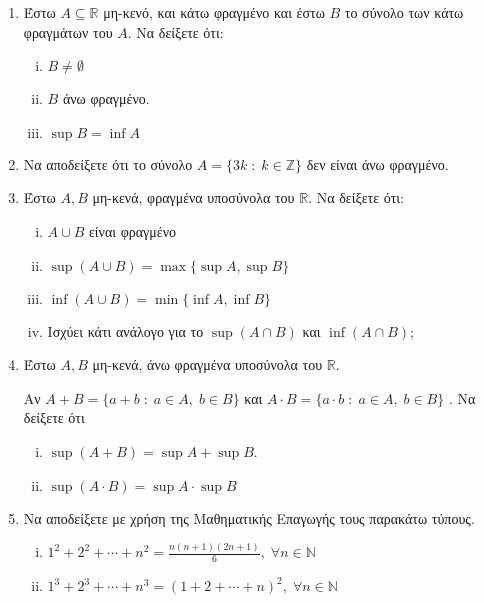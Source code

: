 \begin{enumerate}
    \item Έστω $ A \subseteq \mathbb{R} $ μη-κενό, και κάτω φραγμένο και έστω 
        $ B $ το σύνολο των κάτω φραγμάτων του $A$. Να δείξετε ότι:
        \begin{enumerate}[i)]
            \item $ B \neq \emptyset $
            \item $B$ άνω φραγμένο.
            \item $ \sup B = \inf A $
        \end{enumerate}

    \item \label{ask:3z} Να αποδείξετε ότι το σύνολο $ A = \{ 3k \; : \; k \in \mathbb{Z} \} $ 
        δεν είναι άνω φραγμένο.

    \item Έστω $ A,B $ μη-κενά, φραγμένα υποσύνολα του $ \mathbb{R} $. Να 
        δείξετε ότι:
        \begin{enumerate}[i)]
            \item $ A \cup B  $ είναι φραγμένο
            \item $ \sup {(A\cup B)} = \max \{ \sup A, \sup B \} $
            \item $ \inf {(A\cup B)} = \min \{ \inf A, \inf B \} $
            \item Ισχύει κάτι ανάλογο για το $ \sup {(A\cap B)} $ και 
                $ \inf {(A\cap B)} $;
        \end{enumerate}

    \item Έστω $ A, B $ μη-κενά, άνω φραγμένα υποσύνολα του $ \mathbb{R} $.
        
        Αν $ A+B = \{ a+b \; : \; a \in A, \; b\in B \} $ και $A \cdot B = 
        \{ a\cdot b \; : \; a \in A, \; b \in B\}$ . Να δείξετε ότι 
        \begin{enumerate}[i)]
            \item $ \sup {(A+B)} = \sup A + \sup B $.
            \item $ \sup {(A\cdot B)} = \sup A \cdot \sup B $
        \end{enumerate}

    \item Να αποδείξετε με χρήση της Μαθηματικής Επαγωγής τους παρακάτω τύπους.
        \begin{enumerate}[i)]
            \item $ 1^{2} + 2^{2} + \cdots + n^{2} = \frac{n(n+1)(2n+1)}{6}, \; 
                \forall n \in \mathbb{N} $
            \item $ 1^{3} + 2^{3} + \cdots + n^{3} = (1+2+\cdots + n)^{2}, \; 
                \forall n \in \mathbb{N} $
        \end{enumerate}


\end{enumerate}

